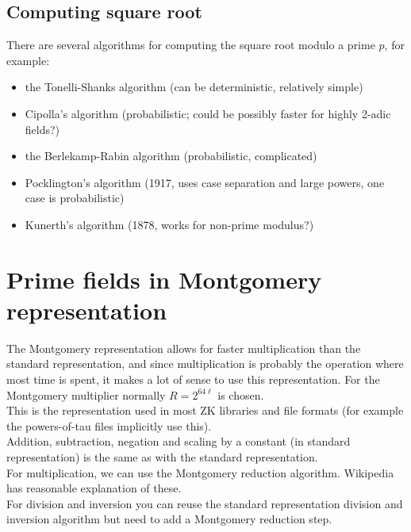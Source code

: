 \documentclass[12pt,draft,a4paper,openany,oneside]{amsbook}
\theoremstyle{plain}
\theoremstyle{definition}
\begin{document}
\subsection{Computing square root}
There are several algorithms for computing the square root modulo a prime $p$, for example:
\begin{itemize}
\item the Tonelli-Shanks algorithm (can be deterministic, relatively simple)
\item Cipolla's algorithm (probabilistic; could be possibly faster for highly 2-adic fields?)
\item the Berlekamp-Rabin algorithm (probabilistic, complicated)
\item Pocklington's algorithm (1917, uses case separation and large powers, one case is probabilistic)
\item Kunerth's algorithm (1878, works for non-prime modulus?)
\end{itemize}


\section{Prime fields in Montgomery representation}

The Montgomery representation allows for faster multiplication than the standard
representation, and since multiplication is probably the operation where most
time is spent, it makes a lot of sense to use this representation. For the 
Montgomery multiplier normally $R=2^{64\ell}$ is chosen.\\

This is the representation used in most ZK libraries and file formats (for example
the powers-of-tau files implicitly use this).\\

Addition, subtraction, negation and scaling by a constant (in standard representation) 
is the same as with the standard representation.\\

For multiplication, we can use the Montgomery reduction algorithm. Wikipedia
has reasonable explanation of these.\\

For division and inversion you can reuse the standard representation division and inversion
algorithm but need to add a Montgomery reduction step.\\
\end{document}
